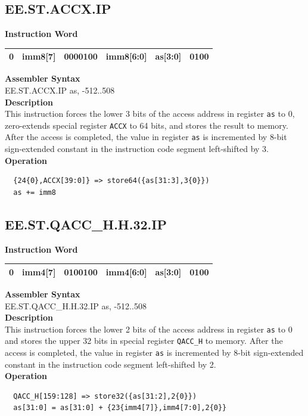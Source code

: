 \clearpage
\subsection{EE.ST.ACCX.IP}\label{instruction:EESTACCXIP}
\setlength\tabcolsep{6pt}
\textbf{Instruction Word} \\
\begin{tabular}{|c|c|c|c|c|c|}
	\hline
	0 & imm8[7] & 0000100 & imm8[6:0] & as[3:0] & 0100 \\
	\hline
\end{tabular}

\textbf{Assembler Syntax} \\
EE.ST.ACCX.IP as, -512..508 \\
\textbf{Description} \\
This instruction forces the lower 3 bits of the access address in register \lstinline{as} to 0, zero-extends special register \lstinline{ACCX} to 64 bits, and stores the result to memory. After the access is completed, the value in register \lstinline{as} is incremented by 8-bit sign-extended constant in the instruction code segment left-shifted by 3.\\
\textbf{Operation}
\begin{lstlisting}
  {24{0},ACCX[39:0]} => store64({as[31:3],3{0}})
  as += imm8
\end{lstlisting}

\clearpage
\subsection{EE.ST.QACC\_H.H.32.IP}\label{instruction:EESTQACCHH32IP}
\setlength\tabcolsep{6pt}
\textbf{Instruction Word} \\
\begin{tabular}{|c|c|c|c|c|c|}
	\hline
	0 & imm4[7] & 0100100 & imm4[6:0] & as[3:0] & 0100 \\
	\hline
\end{tabular}

\textbf{Assembler Syntax} \\
EE.ST.QACC\_H.H.32.IP as, -512..508 \\
\textbf{Description} \\
This instruction forces the lower 2 bits of the access address in register \lstinline{as} to 0 and stores the upper 32 bits in special register \lstinline{QACC_H} to memory. After the access is completed, the value in register \lstinline{as} is incremented by 8-bit sign-extended constant in the instruction code segment left-shifted by 2.\\
\textbf{Operation}
\begin{lstlisting}
  QACC_H[159:128] => store32({as[31:2],2{0}})
  as[31:0] = as[31:0] + {23{imm4[7]},imm4[7:0],2{0}}
\end{lstlisting}

